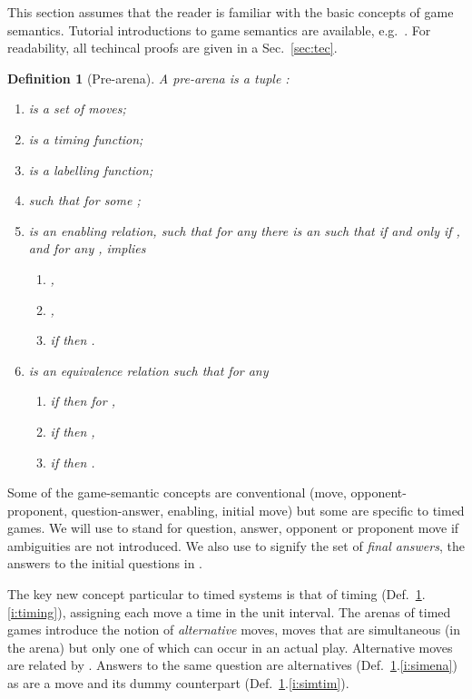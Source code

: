 \documentclass{article}
\newtheorem{definition}[theorem]{Definition}
\begin{document}
This section assumes that the reader is familiar with the basic concepts of game
semantics. Tutorial introductions to game semantics are available, e.g.~\cite{DBLP:conf/lics/Ghica09}. 
For readability, all techincal proofs are given in a Sec.~\ref{sec:tec}.

\begin{definition}[Pre-arena]\label{def:prota}
A \emph{pre-arena}  is a tuple :
\begin{enumerate}
\item \label{i:moves}
  is a set of \emph{moves};
\item \label{i:timing}
 is a  \emph{timing function};
\item \label{i:label}
 is a \emph{labelling function};
\item \label{i:initial}
 such that  for some ;
\item \label{i:enable}
 is an \emph{enabling relation}, such that for any  there is an  such that  if and only if , and for any ,  implies 
\begin{enumerate}
\item \label{i:oqenable}
,
\item \label{i:qenable}
, 
\item \label{i:placehold}
if  then .
\end{enumerate}
\item \label{i:simult}
 is an equivalence relation such that for any  
\begin{enumerate}
\item \label{i:simtim}
if  then  for ,
\item \label{i:simjus}
if  then ,
\item \label{i:simena}
if  then .
\end{enumerate}
\end{enumerate}
\end{definition}
Some of the game-semantic concepts are conventional (move, opponent-proponent, question-answer, enabling, initial move) but some are specific to timed games. We will use  to stand for question, answer, opponent or proponent move if ambiguities are not introduced. We also use  to signify the set of \emph{final answers}, the answers to the initial questions in .

The key new concept particular to timed systems is that of timing (Def.~\ref{def:prota}.\ref{i:timing}), assigning each move a time in the unit interval. The arenas of timed games introduce the notion of \emph{alternative} moves, moves that are simultaneous (in the arena) but only one of which can occur in an actual play. Alternative moves are related by . Answers to the same question are alternatives (Def.~\ref{def:prota}.\ref{i:simena}) as are a move and its dummy counterpart (Def.~\ref{def:prota}.\ref{i:simtim}). 
\end{document}
